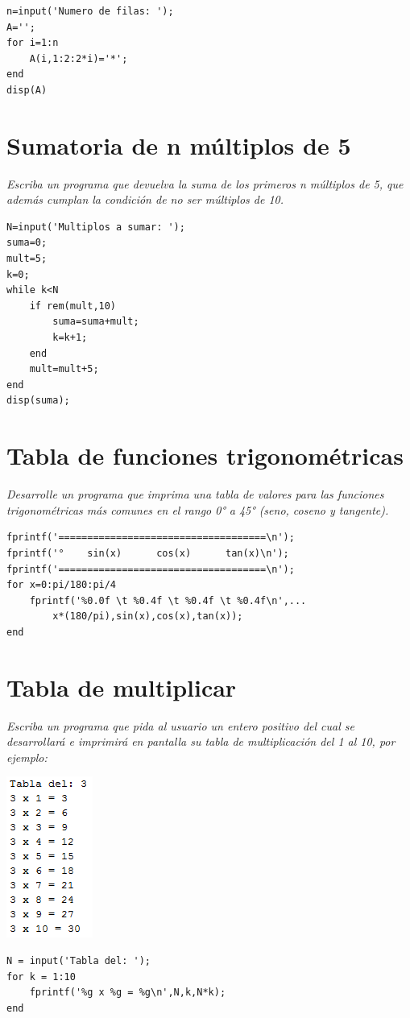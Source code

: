 \sol

\begin{verbatim}
n=input('Numero de filas: ');
A='';
for i=1:n
    A(i,1:2:2*i)='*';
end
disp(A)
\end{verbatim}


\section{Sumatoria de n múltiplos de 5}

\textit{Escriba un programa que devuelva la suma de los primeros n múltiplos de 5, que además cumplan la condición de no ser múltiplos de 10.}

\begin{verbatim}
N=input('Multiplos a sumar: ');
suma=0;
mult=5;
k=0;
while k<N
    if rem(mult,10)
        suma=suma+mult;
        k=k+1;
    end
    mult=mult+5;
end
disp(suma);
\end{verbatim}

\section{Tabla de funciones trigonométricas}

\textit{Desarrolle un programa que imprima una tabla de valores para las funciones trigonométricas más comunes en el rango 0° a 45° (seno, coseno y tangente).}

\begin{verbatim}
fprintf('====================================\n');
fprintf('°    sin(x)      cos(x)      tan(x)\n');
fprintf('====================================\n');
for x=0:pi/180:pi/4
    fprintf('%0.0f \t %0.4f \t %0.4f \t %0.4f\n',...
        x*(180/pi),sin(x),cos(x),tan(x));
end
\end{verbatim}

\section{Tabla de multiplicar} 

\textit{Escriba un programa que pida al usuario un entero positivo del cual se desarrollará e imprimirá en pantalla su tabla de multiplicación del 1 al 10, por ejemplo:}

\begin{center}
\includegraphics[scale=0.8]{src/tablamult.png}
\end{center}

\sol

\begin{verbatim}
N = input('Tabla del: ');
for k = 1:10
    fprintf('%g x %g = %g\n',N,k,N*k);
end
\end{verbatim}
